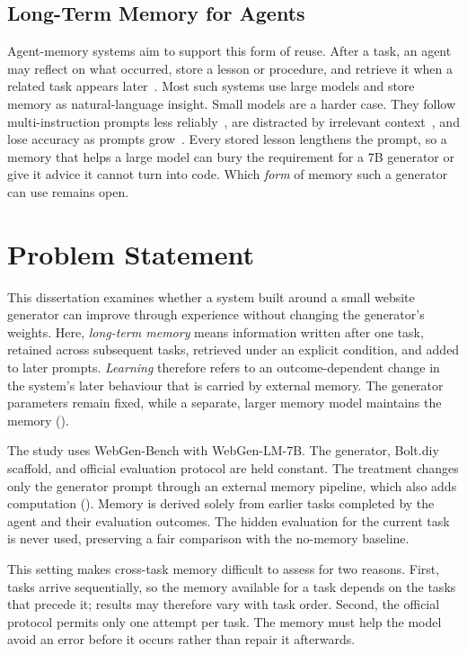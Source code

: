 \subsection{Long-Term Memory for Agents}
Agent-memory systems aim to support this form of reuse. After a task, an agent may reflect on what occurred, store a lesson or procedure, and retrieve it when a related task appears later~\cite{zhao2024expel,wang2023voyager,reasoningbank2025,wang2025awm,dai2026metis}. Most such systems use large models and store memory as natural-language insight. Small models are a harder case. They follow multi-instruction prompts less reliably~\cite{harada2025curse,jaroslawicz2025ifscale,li2025smallmodels}, are distracted by irrelevant context~\cite{shi2023distracted}, and lose accuracy as prompts grow~\cite{du2025contextlength,liu2024lost}. Every stored lesson lengthens the prompt, so a memory that helps a large model can bury the requirement for a 7B generator or give it advice it cannot turn into code. Which \emph{form} of memory such a generator can use remains open.

\section{Problem Statement}
This dissertation examines whether a system built around a small website generator can improve through experience without changing the generator's weights. Here, \emph{long-term memory} means information written after one task, retained across subsequent tasks, retrieved under an explicit condition, and added to later prompts. \emph{Learning} therefore refers to an outcome-dependent change in the system's later behaviour that is carried by external memory. The generator parameters remain fixed, while a separate, larger memory model maintains the memory ().

The study uses WebGen-Bench with WebGen-LM-7B. The generator, Bolt.diy scaffold, and official evaluation protocol are held constant. The treatment changes only the generator prompt through an external memory pipeline, which also adds computation (). Memory is derived solely from earlier tasks completed by the agent and their evaluation outcomes. The hidden evaluation for the current task is never used, preserving a fair comparison with the no-memory baseline.

This setting makes cross-task memory difficult to assess for two reasons. First, tasks arrive sequentially, so the memory available for a task depends on the tasks that precede it; results may therefore vary with task order. Second, the official protocol permits only one attempt per task. The memory must help the model avoid an error before it occurs rather than repair it afterwards.

